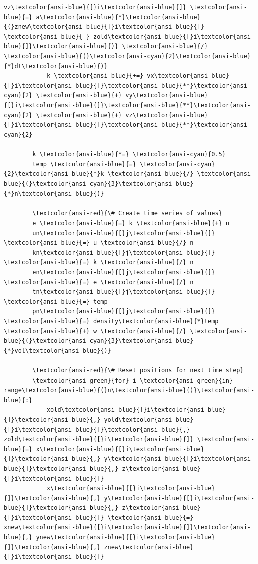 \documentclass[11pt]{article}
\begin{document}
\begin{Verbatim}[commandchars=\\\{\}]
            vz\textcolor{ansi-blue}{[}i\textcolor{ansi-blue}{]} \textcolor{ansi-blue}{=} a\textcolor{ansi-blue}{*}\textcolor{ansi-blue}{(}znew\textcolor{ansi-blue}{[}i\textcolor{ansi-blue}{]} \textcolor{ansi-blue}{-} zold\textcolor{ansi-blue}{[}i\textcolor{ansi-blue}{]}\textcolor{ansi-blue}{)} \textcolor{ansi-blue}{/} \textcolor{ansi-blue}{(}\textcolor{ansi-cyan}{2}\textcolor{ansi-blue}{*}dt\textcolor{ansi-blue}{)}
            k \textcolor{ansi-blue}{+=} vx\textcolor{ansi-blue}{[}i\textcolor{ansi-blue}{]}\textcolor{ansi-blue}{**}\textcolor{ansi-cyan}{2} \textcolor{ansi-blue}{+} vy\textcolor{ansi-blue}{[}i\textcolor{ansi-blue}{]}\textcolor{ansi-blue}{**}\textcolor{ansi-cyan}{2} \textcolor{ansi-blue}{+} vz\textcolor{ansi-blue}{[}i\textcolor{ansi-blue}{]}\textcolor{ansi-blue}{**}\textcolor{ansi-cyan}{2}

        k \textcolor{ansi-blue}{*=} \textcolor{ansi-cyan}{0.5}
        temp \textcolor{ansi-blue}{=} \textcolor{ansi-cyan}{2}\textcolor{ansi-blue}{*}k \textcolor{ansi-blue}{/} \textcolor{ansi-blue}{(}\textcolor{ansi-cyan}{3}\textcolor{ansi-blue}{*}n\textcolor{ansi-blue}{)}

        \textcolor{ansi-red}{\# Create time series of values}
        e \textcolor{ansi-blue}{=} k \textcolor{ansi-blue}{+} u
        un\textcolor{ansi-blue}{[}j\textcolor{ansi-blue}{]} \textcolor{ansi-blue}{=} u \textcolor{ansi-blue}{/} n
        kn\textcolor{ansi-blue}{[}j\textcolor{ansi-blue}{]} \textcolor{ansi-blue}{=} k \textcolor{ansi-blue}{/} n
        en\textcolor{ansi-blue}{[}j\textcolor{ansi-blue}{]} \textcolor{ansi-blue}{=} e \textcolor{ansi-blue}{/} n
        tn\textcolor{ansi-blue}{[}j\textcolor{ansi-blue}{]} \textcolor{ansi-blue}{=} temp
        pn\textcolor{ansi-blue}{[}j\textcolor{ansi-blue}{]} \textcolor{ansi-blue}{=} density\textcolor{ansi-blue}{*}temp \textcolor{ansi-blue}{+} w \textcolor{ansi-blue}{/} \textcolor{ansi-blue}{(}\textcolor{ansi-cyan}{3}\textcolor{ansi-blue}{*}vol\textcolor{ansi-blue}{)}

        \textcolor{ansi-red}{\# Reset positions for next time step}
        \textcolor{ansi-green}{for} i \textcolor{ansi-green}{in} range\textcolor{ansi-blue}{(}n\textcolor{ansi-blue}{)}\textcolor{ansi-blue}{:}
            xold\textcolor{ansi-blue}{[}i\textcolor{ansi-blue}{]}\textcolor{ansi-blue}{,} yold\textcolor{ansi-blue}{[}i\textcolor{ansi-blue}{]}\textcolor{ansi-blue}{,} zold\textcolor{ansi-blue}{[}i\textcolor{ansi-blue}{]} \textcolor{ansi-blue}{=} x\textcolor{ansi-blue}{[}i\textcolor{ansi-blue}{]}\textcolor{ansi-blue}{,} y\textcolor{ansi-blue}{[}i\textcolor{ansi-blue}{]}\textcolor{ansi-blue}{,} z\textcolor{ansi-blue}{[}i\textcolor{ansi-blue}{]}
            x\textcolor{ansi-blue}{[}i\textcolor{ansi-blue}{]}\textcolor{ansi-blue}{,} y\textcolor{ansi-blue}{[}i\textcolor{ansi-blue}{]}\textcolor{ansi-blue}{,} z\textcolor{ansi-blue}{[}i\textcolor{ansi-blue}{]} \textcolor{ansi-blue}{=} xnew\textcolor{ansi-blue}{[}i\textcolor{ansi-blue}{]}\textcolor{ansi-blue}{,} ynew\textcolor{ansi-blue}{[}i\textcolor{ansi-blue}{]}\textcolor{ansi-blue}{,} znew\textcolor{ansi-blue}{[}i\textcolor{ansi-blue}{]}


\end{Verbatim}
\end{document}
